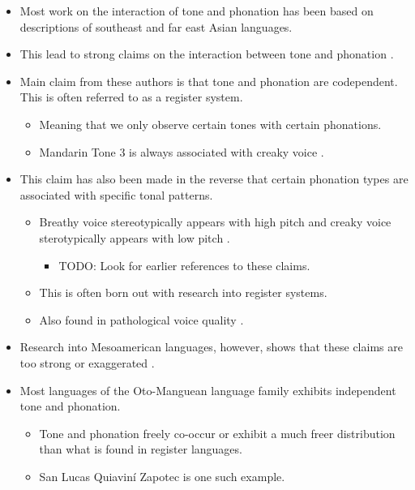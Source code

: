 \documentclass[12pt, letterpaper]{article}
\begin{document}
\begin{itemize}
	\item Most work on the interaction of tone and phonation has been based on descriptions of southeast and far east Asian languages.
	\item This lead to strong claims on the interaction between tone and phonation \citep{masicaDefiningLinguisticArea1976,thurgoodVietnameseTonogenesisRevising2002,yipTone2002,enfieldArealLinguisticsMainland2005,michaudComplexTonesEast2012,brunelleTonePhonationSoutheast2016}.
	\item Main claim from these authors is that tone and phonation are codependent. This is often referred to as a register system.  
	\begin{itemize}
		\item Meaning that we only observe certain tones with certain phonations. 
		\item Mandarin Tone 3 is always associated with creaky voice \citep{duanmuPhonologyStandardChinese2007}.
	\end{itemize}
	\item This claim has also been made in the reverse that certain phonation types are associated with specific tonal patterns. 
	\begin{itemize}
		\item Breathy voice stereotypically appears with high pitch and creaky voice sterotypically appears with low pitch \citep{eslingVoiceQualityLaryngeal2019}.
		\begin{itemize}
			\item TODO:\/\/ Look for earlier references to these claims. 
		\end{itemize}
		\item This is often born out with research into register systems. 
		\item Also found in pathological voice quality \citep{klattAnalysisSynthesisPerception1990,titzePrinciplesVoiceProduction2000,eslingVoiceQualityLaryngeal2019}.
	\end{itemize}
	\item Research into Mesoamerican languages, however, shows that these claims are too strong or exaggerated \citep{suarezMesoamericanIndianLanguages1983,campbellMesoAmericaLinguisticArea1986,silvermanLaryngealComplexityOtomanguean1997,dicanioPhoneticsPhonologySan2008,espositoEffectsLinguisticExperience2010,campbellOtomangueanHistoricalLinguistics2017a,campbellOtomangueanHistoricalLinguistics2017}. 
	\item Most languages of the Oto-Manguean language family exhibits independent tone and phonation.
	\begin{itemize}
		\item Tone and phonation freely co-occur or exhibit a much freer distribution than what is found in register languages. 
		\item San Lucas Quiaviní Zapotec is one such example.
	\end{itemize}
\end{itemize}
\end{document}
